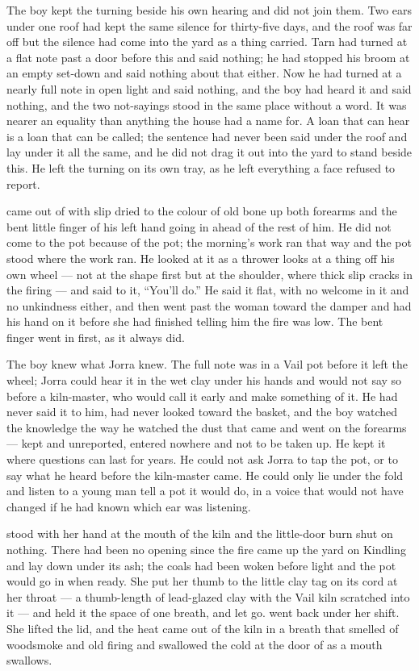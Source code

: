 The boy kept the turning beside his own hearing and did not join them. Two ears under one roof had kept the same silence for thirty-five days, and the roof was far off but the silence had come into the yard as a thing carried. Tarn had turned at a flat note past a door before this and said nothing; he had stopped his broom at an empty set-down and said nothing about that either. Now he had turned at a nearly full note in open light and said nothing, and the boy had heard it and said nothing, and the two not-sayings stood in the same place without a word. It was nearer an equality than anything the house had a name for. A loan that can hear is a loan that can be called; the sentence had never been said under the roof and lay under it all the same, and he did not drag it out into the yard to stand beside this. He left the turning on its own tray, as he left everything a face refused to report.

 came out of  with slip dried to the colour of old bone up both forearms and the bent little finger of his left hand going in ahead of the rest of him. He did not come to the pot because of the pot; the morning's work ran that way and the pot stood where the work ran. He looked at it as a thrower looks at a thing off his own wheel --- not at the shape first but at the shoulder, where thick slip cracks in the firing --- and said to it, “You'll do.” He said it flat, with no welcome in it and no unkindness either, and then went past the woman toward the damper and had his hand on it before she had finished telling him the fire was low. The bent finger went in first, as it always did.

The boy knew what Jorra knew. The full note was in a Vail pot before it left the wheel; Jorra could hear it in the wet clay under his hands and would not say so before a kiln-master, who would call it early and make something of it. He had never said it to him, had never looked toward the basket, and the boy watched the knowledge the way he watched the dust that came and went on the forearms --- kept and unreported, entered nowhere and not to be taken up. He kept it where questions can last for years. He could not ask Jorra to tap the pot, or to say what he heard before the kiln-master came. He could only lie under the fold and listen to a young man tell a pot it would do, in a voice that would not have changed if he had known which ear was listening.

 stood with her hand at the mouth of the kiln and the little-door burn shut on nothing. There had been no opening since the fire came up the yard on Kindling and lay down under its ash; the coals had been woken before light and the pot would go in when ready. She put her thumb to the little clay tag on its cord at her throat --- a thumb-length of lead-glazed clay with the Vail kiln scratched into it --- and held it the space of one breath, and let go.  went back under her shift. She lifted the lid, and the heat came out of the kiln in a breath that smelled of woodsmoke and old firing and swallowed the cold at the door of  as a mouth swallows.


